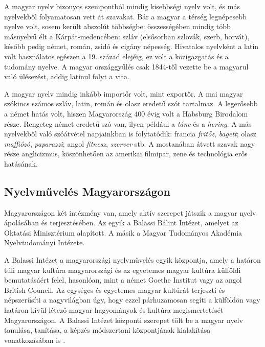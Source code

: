 \begin{multicols}{2}
  A magyar nyelv bizonyos szempontból mindig kisebbségi nyelv volt, és más nyelvekből folyamatosan vett át szavakat. Bár a magyar a térség legnépesebb nyelve volt, sosem került abszolút többségbe: összességében mindig több másnyelvű élt a Kárpát-medencében: szláv (elsősorban szlovák, szerb, horvát), később pedig német, román, zsidó és cigány népesség. Hivatalos nyelvként a latin volt használatos egészen a 19. század elejéig, ez volt a közigazgatás és a tudomány nyelve. A magyar országgyűlés csak 1844-től vezette be a magyarul való ülésezést, addig latinul folyt a vita. 

  A magyar nyelv mindig inkább importőr volt, mint exportőr. A mai magyar szó\-kincs számos szláv, latin, román és olasz eredetű szót tartalmaz. A legerősebb a német hatás volt, hiszen Magyarország 400 évig volt a Habsburg Birodalom része. Rengeteg német eredetű szó van, ilyen például a \textit{tánc} és a \textit{hering}. A más nyelvekből való szóátvétel napjainkban is folytatódik: francia \textit{fritőz}, \textit{bagett}; olasz \textit{maffiózó}, \textit{paparazzi}; angol \textit{fitnesz}, \textit{szerver} stb. A mostanában átvett szavak nagy része anglicizmus, köszönhetően az amerikai filmipar, zene és technológia erős hatásának.

  \subsection{Nyelvművelés Magyarországon}

  Magyarországon két intézmény van, amely aktív szerepet játszik a magyar nyelv ápolásában és terjesztésében. Az egyik a Balassi Bálint Intézet, amelyet az Oktatási Minisztérium alapított. A másik a Magyar Tudományos Akadémia Nyelvtudományi Intézete.

  A Balassi Intézet a magyarországi nyelv\-mű\-ve\-lés egyik központja, amely a határon túli magyar kultúra magyarországi és az egyetemes magyar kultúra külföldi bemutatásáért felel, hasonlóan, mint a német Goethe Institut vagy az angol British Council. Az egységes és egyetemes ma\-gyar kultúrát terjeszti és népszerűsíti a nagyvilágban úgy, hogy ezzel pár\-hu\-za\-mo\-san segíti a külföldön vagy határon kívül létező magyar hagyományok és kultúra megismertetését Magyarországon. A Ba\-las\-si Intézet központi szerepet tölt be a magyar nyelv tanulása, tanítása, a képzés módszertani központjának kialakítása vo\-nat\-ko\-zá\-sá\-ban is \cite{bbi}. 



\end{multicols}
